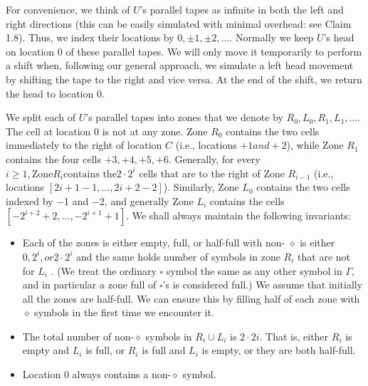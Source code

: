 \documentclass[a4paper,12pt]{article}
\begin{document}
	For convenience, we think of $U$’s parallel tapes as infinite in both the left and right
directions (this can be easily simulated with minimal overhead: see Claim 1.8). Thus, we
index their locations by $0, \pm 1, \pm 2, \dotsc $. Normally we keep $U$’s head on location 0 of these
parallel tapes. We will only move it temporarily to perform a shift when, following our
general approach, we simulate a left head movement by shifting the tape to the right
and vice versa. At the end of the shift, we return the head to location 0.

	We split each of $U$’s parallel tapes into zones that we denote by
$R_0 , L_0 , R_1 , L_1 , \dotsc$. The cell at location 0 is not at any zone. Zone $R_0$ contains the two cells immediately to the right of location \(C\) (i.e.,
locations \(+1 and +2\)), while Zone \(R_1\) contains the four cells \(+3, +4, +5, +6\). Generally,
for every \(i ≥ 1, \text{Zone} R_i \text{contains the} 2 \cdot 2^i\) cells that are to the right of Zone $R_{i−1}$ (i.e.,
locations \([2 i+1 − 1, . . . , 2 i+2 − 2]\)). Similarly, Zone $L_0$ contains the two cells indexed by
−1 and −2, and generally Zone $L_i$ contains the cells $[−2^{i+2} + 2, \dotsc , −2^{i+1} + 1]$. We
shall always maintain the following invariants:
\begin{itemize}
\item Each of the zones is either empty, full, or half-full with non- 
$\diamond$ is either \(0, 2^i , or 2 \cdot 2^i\) and the same holds
number of symbols in zone $R_i$ that are not 
for $L_i$ . (We treat the ordinary $\square$ symbol the same as any other symbol in $\Gamma$, and in
particular a zone full of  $\square$’s is considered full.) We assume that initially all the zones are half-full. We can ensure this by filling half of each zone with $\diamond$ symbols in the first time we encounter it.
\item The total number of non-$\diamond$ symbols in $R_i \cup L_i$ is $2 \cdot 2 i$. That is, either $R_i$ is empty and $L_i$ is full, or $R_i$ is full and $L_i$ is empty, or they are both half-full.
\item Location 0 always contains a non-$\diamond$ symbol.
\end{itemize}
\end{document}
